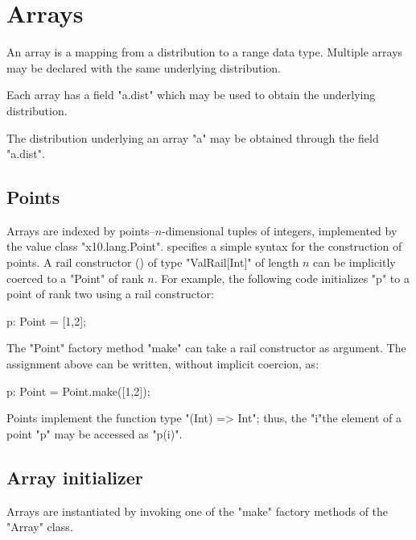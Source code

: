 \chapter{Arrays}\label{XtenArrays}

An array is a mapping from a distribution to a range data
type. Multiple arrays may be declared with the same underlying
distribution. 

Each array has a field \xcd"a.dist" which may be used to
obtain the underlying
distribution.

The distribution underlying an array \xcd"a" may be obtained through
the field \xcd"a.dist".

\section{Points}\label{point-syntax}

Arrays are indexed by points--$n$-dimensional tuples of
integers, implemented by the value class \xcd"x10.lang.Point".
\Xten{} specifies a simple syntax for the construction of points.
A rail constructor () of type \xcd"ValRail[Int]"
of length $n$
can be implicitly coerced to a \xcd"Point" of rank $n$.  For
example, the following code initializes \xcd"p" to a point of
rank two using a rail constructor:

\begin{xten}
p: Point = [1,2];
\end{xten}

The \xcd"Point" factory method \xcd"make" can take a rail constructor as
argument.  The assignment above can be written, without
implicit coercion, as:

\begin{xten}
p: Point = Point.make([1,2]);
\end{xten}

Points implement the function type \xcd"(Int) => Int"; thus, the
\xcd"i"the element of a point \xcd"p" may be accessed as \xcd"p(i)".



\section{Array initializer}\label{ArrayInitializer}\label{array!creation}

Arrays are instantiated by invoking one of the \xcd"make" factory
methods of the \xcd"Array" class.

